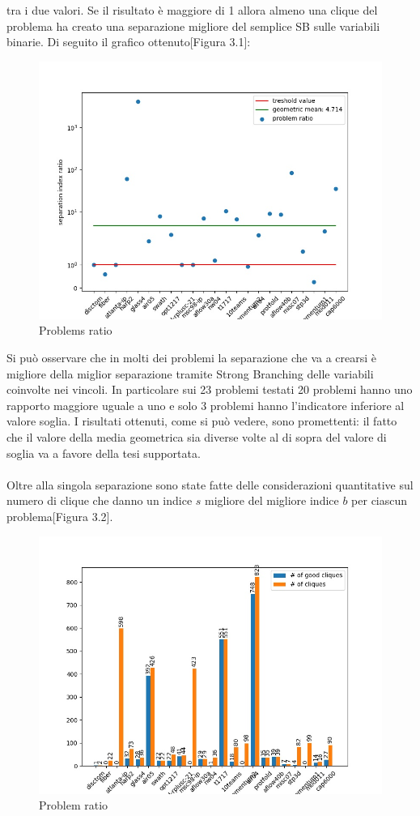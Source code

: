 \documentclass[12pt,a4paper,twoside,openright]{book}
\begin{document}
tra i due valori. Se il risultato è maggiore di 1 allora almeno una clique del problema ha creato una separazione migliore del semplice SB
sulle variabili binarie. Di seguito il grafico ottenuto[Figura 3.1]:
\begin{figure}[ht]
    \centering
    \includegraphics [scale = 0.65]{chart_agg}
    \caption{Problems ratio}
    \label{fig:ratio}
\end{figure}
\clearpage
Si può osservare che in molti dei problemi la separazione che va a crearsi è migliore della miglior separazione 
tramite Strong Branching delle variabili coinvolte nei vincoli. In particolare sui 23 problemi testati
20 problemi hanno uno rapporto maggiore uguale a uno e solo 3 problemi hanno l'indicatore inferiore al valore soglia.
I risultati ottenuti, come si può vedere, sono promettenti: il fatto che il valore della media geometrica sia diverse volte
al di sopra del valore di soglia va a favore della tesi supportata. \\\\
Oltre alla singola separazione sono state fatte delle considerazioni quantitative sul numero di clique che danno un 
indice $s$ migliore del migliore indice $b$ per ciascun problema[Figura 3.2].
\begin{figure}[ht]
    \centering
    \includegraphics [scale = 0.65]{chart_agg2}
    \caption{Problem ratio}
    \label{fig:ratio}
\end{figure}\\
\end{document}
